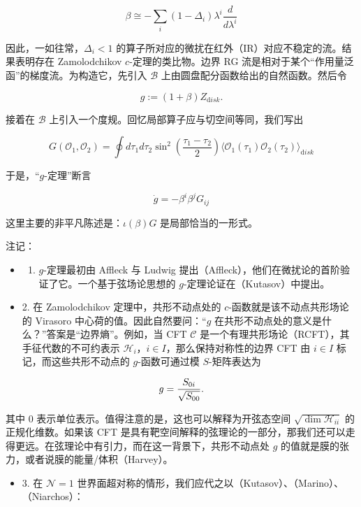 \documentclass[11pt,a4paper]{ctexart}
\begin{document}
\[\beta \cong  - \sum_i (1-\Delta_i) \lambda^i \frac{d}{d\lambda^i}\]

因此，一如往常，\(\Delta_i<1\) 的算子所对应的微扰在红外（IR）对应不稳定的流。结果表明存在 Zamolodchikov \(c\)-定理的类比物。边界 RG 流是相对于某个``作用量泛函''的梯度流。为构造它，先引入 \({\mathcal B}\) 上由圆盘配分函数给出的自然函数。然后令

\[g :=  (1+ \beta) Z_{\mathrm disk} .\]

接着在 \({\mathcal B}\) 上引入一个度规。回忆局部算子应与切空间等同，我们写出

\[G({\mathcal O}_1, {\mathcal O}_2) = \oint d\tau_1 d\tau_2 \sin^2(\frac{\tau_1- \tau_2}{2})
\langle {\mathcal O}_1(\tau_1) {\mathcal O}_2(\tau_2) \rangle_{\mathrm disk}\]

于是，``\(g\)-定理''断言

\[\dot g = - \beta^i \beta^j G_{ij}\]

这里主要的非平凡陈述是：\(\iota(\beta)G\) 是局部恰当的一形式。

注记：

\begin{itemize}
\tightlist
\item
  \begin{enumerate}
  \def\labelenumi{\arabic{enumi}.}
  \tightlist
  \item
    \(g\)-定理最初由 Affleck 与 Ludwig 提出（Affleck），他们在微扰论的首阶验证了它。一个基于弦场论思想的 \(g\)-定理论证在（Kutasov）中提出。
  \end{enumerate}
\item
  2. 在 Zamolodchikov 定理中，共形不动点处的 \(c\)-函数就是该不动点共形场论的 Virasoro 中心荷的值。因此自然要问：``\(g\) 在共形不动点处的意义是什么？''答案是``边界熵''。例如，当 CFT \({\mathcal C}\) 是一个有理共形场论（RCFT），其手征代数的不可约表示 \({\mathcal H}_i\)，\(i\in I\)，那么保持对称性的边界 CFT 由 \(i\in I\) 标记，而这些共形不动点的 \(g\)-函数可通过模 \(S\)-矩阵表达为
\end{itemize}

\[g = {S_{0i}\over \sqrt{S_{00}}} .\]

其中 \(0\) 表示单位表示。值得注意的是，这也可以解释为开弦态空间 \(\sqrt{ \dim {\mathcal H}_{ii}}\) 的正规化维数。如果该 CFT 是具有靶空间解释的弦理论的一部分，那我们还可以走得更远。在弦理论中有引力，而在这一背景下，共形不动点处 \(g\) 的值就是膜的张力，或者说膜的能量/体积（Harvey）。

\begin{itemize}
\tightlist
\item
  3. 在 \({\mathcal N}=1\) 世界面超对称的情形，我们应代之以（Kutasov）、（Marino）、（Niarchos）：
\end{itemize}
\end{document}
